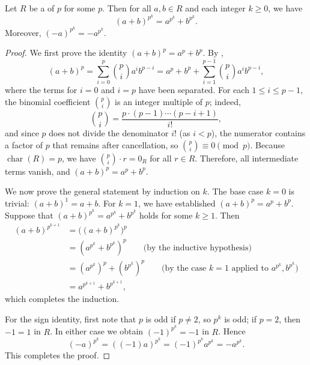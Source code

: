 \begin{lemma} \label{lemma:freshmans_dream_identity_in_characteristic_p}
    Let $R$ be a  of  $p$ for some  $p$. Then for all $a, b \in R$ and each integer $k \geq 0$, we have
    $$(a + b)^{p^k} = a^{p^k} + b^{p^k}.$$
    Moreover, $(-a)^{p^k} = -a^{p^k}$.
\end{lemma}
\begin{proof}
    We first prove the identity $(a + b)^p = a^p + b^p$. By ,
    $$(a + b)^p = \sum_{i=0}^p \binom{p}{i} a^i b^{p-i} = a^p + b^p + \sum_{i=1}^{p-1} \binom{p}{i} a^i b^{p-i},$$
    where the terms for $i = 0$ and $i = p$ have been separated. For each $1 \leq i \leq p-1$, the binomial coefficient $\binom{p}{i}$ is an integer multiple of $p$; indeed,
    $$\binom{p}{i} = \frac{p \cdot (p-1) \cdots (p-i+1)}{i!},$$
    and since $p$ does not divide the denominator $i!$ (as $i < p$), the numerator contains a factor of $p$ that remains after cancellation, so $\binom{p}{i} \equiv 0 \pmod{p}$. Because $\operatorname{char}(R) = p$, we have $\binom{p}{i} \cdot r = 0_R$ for all $r \in R$. Therefore, all intermediate terms vanish, and $(a + b)^p = a^p + b^p$.

    We now prove the general statement by induction on $k$. The base case $k = 0$ is trivial: $(a + b)^1 = a + b$. For $k = 1$, we have established $(a + b)^p = a^p + b^p$. Suppose that $(a + b)^{p^k} = a^{p^k} + b^{p^k}$ holds for some $k \geq 1$. Then
    \begin{align*}
        (a + b)^{p^{k+1}} &= \bigl((a + b)^{p^k}\bigr)^p \\
        &= (a^{p^k} + b^{p^k})^p \qquad\text{(by the inductive hypothesis)}\\
        &= (a^{p^k})^p + (b^{p^k})^p \qquad\text{(by the case $k = 1$ applied to $a^{p^k}, b^{p^k}$)}\\
        &= a^{p^{k+1}} + b^{p^{k+1}},
    \end{align*}
    which completes the induction.

    For the sign identity, first note that $p$ is odd if $p \neq 2$, so $p^k$ is odd; if $p = 2$, then $-1 = 1$ in $R$. In either case we obtain $(-1)^{p^k} = -1$ in $R$. Hence
    $$(-a)^{p^k} = ((-1)a)^{p^k} = (-1)^{p^k} a^{p^k} = -a^{p^k}.$$
    This completes the proof.
\end{proof}